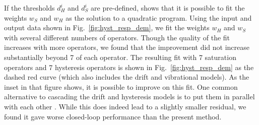 \documentclass[twocolumn,twoside]{IEEEtran}
\begin{document}
If the thresholds $d_H^i$ and $d_S^i$ are pre-defined, \cite{kuhnen_modeling_2003} shows that it is possible to fit the weights $w_S$ and $w_H$ as the solution to a quadratic program. Using the input and output data shown in Fig.~\ref{fig:hyst_resp_dem}, we fit the weights $w_H$ and $w_S$ with several different numbers of operators. Though the quality of the fit increases with more operators, we found that the improvement did not increase substantially beyond 7 of each operator. 
The resulting fit with 7 saturation operators and 7 hysteresis operators is shown in Fig.~\ref{fig:hyst_resp_dem} as the dashed red curve (which also includes the drift and vibrational models). As the inset in that figure shows, it is possible to improve on this fit. One common alternative to cascading the drift and hysteresis models is to put them in parallel with each other \cite{mokaberi_compensation_2008, Krejci_inverse_2001}. While this does indeed lead to a slightly smaller residual, we found it gave worse closed-loop performance than the present method.
\end{document}
